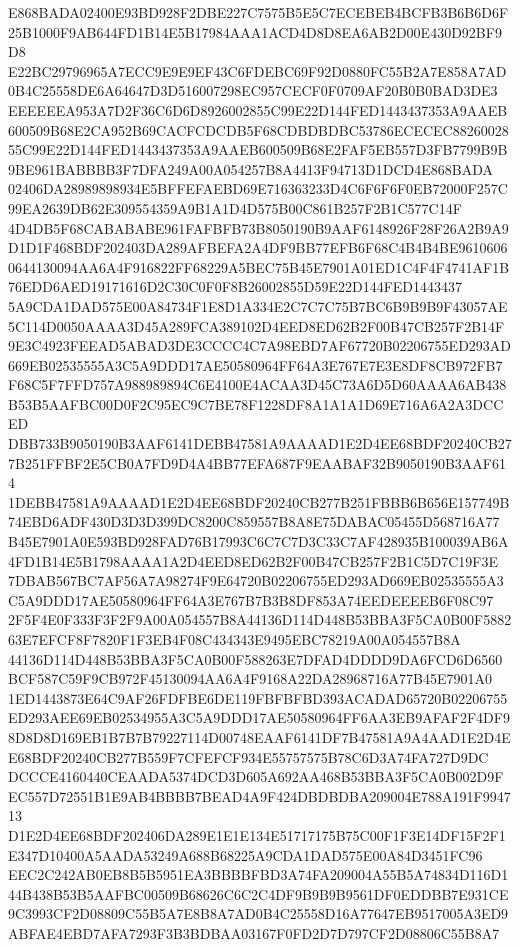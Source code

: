 \documentclass[UTF8,fontset=fandol,zihao=-4,a4paper]{ctexart}
\begin{document}
{{E868BADA02400E93BD928F2DBE227C7575B5E5C7ECEBEB4BCFB3B6B6D6F25B1000F9AB644FD1B14E5B17984AAA1ACD4D8D8EA6AB2D00E430D92BF9D8
E22BC29796965A7ECC9E9E9EF43C6FDEBC69F92D0880FC55B2A7E858A7AD0B4C25558DE6A64647D3D516007298EC957CECF0F0709AF20B0B0BAD3DE3
EEEEEEA953A7D2F36C6D6D8926002855C99E22D144FED1443437353A9AAEB600509B68E2CA952B69CACFCDCDB5F68CDBDBDBC53786ECECEC88260028
55C99E22D144FED1443437353A9AAEB600509B68E2FAF5EB557D3FB7799B9B9BE961BABBBB3F7DFA249A00A054257B8A4413F94713D1DCD4E868BADA
02406DA28989898934E5BFFEFAEBD69E716363233D4C6F6F6F0EB72000F257C99EA2639DB62E309554359A9B1A1D4D575B00C861B257F2B1C577C14F
4D4DB5F68CABABABE961FAFBFB73B8050190B9AAF6148926F28F26A2B9A9D1D1F468BDF202403DA289AFBEFA2A4DF9BB77EFB6F68C4B4B4BE9610606
0644130094AA6A4F916822FF68229A5BEC75B45E7901A01ED1C4F4F4741AF1B76EDD6AED19171616D2C30C0F0F8B26002855D59E22D144FED1443437
5A9CDA1DAD575E00A84734F1E8D1A334E2C7C7C75B7BC6B9B9B9F43057AE5C114D0050AAAA3D45A289FCA389102D4EED8ED62B2F00B47CB257F2B14F
9E3C4923FEEAD5ABAD3DE3CCCC4C7A98EBD7AF67720B02206755ED293AD669EB02535555A3C5A9DDD17AE50580964FF64A3E767E7E3E8DF8CB972FB7
F68C5F7FFD757A988989894C6E4100E4ACAA3D45C73A6D5D60AAAA6AB438B53B5AAFBC00D0F2C95EC9C7BE78F1228DF8A1A1A1D69E716A6A2A3DCCED
DBB733B9050190B3AAF6141DEBB47581A9AAAAD1E2D4EE68BDF20240CB277B251FFBF2E5CB0A7FD9D4A4BB77EFA687F9EAABAF32B9050190B3AAF614
1DEBB47581A9AAAAD1E2D4EE68BDF20240CB277B251FBBB6B656E157749B74EBD6ADF430D3D3D399DC8200C859557B8A8E75DABAC05455D568716A77
B45E7901A0E593BD928FAD76B17993C6C7C7D3C33C7AF428935B100039AB6A4FD1B14E5B1798AAAA1A2D4EED8ED62B2F00B47CB257F2B1C5D7C19F3E
7DBAB567BC7AF56A7A98274F9E64720B02206755ED293AD669EB02535555A3C5A9DDD17AE50580964FF64A3E767B7B3B8DF853A74EEDEEEEB6F08C97
2F5F4E0F333F3F2F9A00A054557B8A44136D114D448B53BBA3F5CA0B00F588263E7EFCF8F7820F1F3EB4F08C434343E9495EBC78219A00A054557B8A
44136D114D448B53BBA3F5CA0B00F588263E7DFAD4DDDD9DA6FCD6D6560BCF587C59F9CB972F45130094AA6A4F9168A22DA28968716A77B45E7901A0
1ED1443873E64C9AF26FDFBE6DE119FBFBFBD393ACADAD65720B02206755ED293AEE69EB02534955A3C5A9DDD17AE50580964FF6AA3EB9AFAF2F4DF9
8D8D8D169EB1B7B7B79227114D00748EAAF6141DF7B47581A9A4AAD1E2D4EE68BDF20240CB277B559F7CFEFCF934E55757575B78C6D3A74FA727D9DC
DCCCE4160440CEAADA5374DCD3D605A692AA468B53BBA3F5CA0B002D9FEC557D72551B1E9AB4BBBB7BEAD4A9F424DBDBDBA209004E788A191F994713
D1E2D4EE68BDF202406DA289E1E1E134E51717175B75C00F1F3E14DF15F2F1E347D10400A5AADA53249A688B68225A9CDA1DAD575E00A84D3451FC96
EEC2C242AB0EB8B5B5951EA3BBBBFBD3A74FA209004A55B5A74834D116D144B438B53B5AAFBC00509B68626C6C2C4DF9B9B9B9561DF0EDDBB7E931CE
9C3993CF2D08809C55B5A7E8B8A7AD0B4C25558D16A77647EB9517005A3ED9ABFAE4EBD7AFA7293F3B3BDBAA03167F0FD2D7D797CF2D08806C55B8A7
}}
\end{document}
